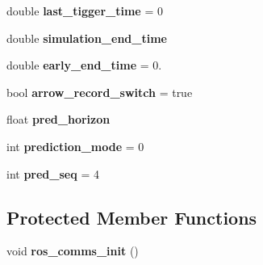 \begin{DoxyCompactItemize}
\item 
double {\bfseries last\+\_\+tigger\+\_\+time} = 0\hypertarget{class_q_node_a932e8eb11684f38ae2fb3f23639b7c70}{}\label{class_q_node_a932e8eb11684f38ae2fb3f23639b7c70}

\item 
double {\bfseries simulation\+\_\+end\+\_\+time}\hypertarget{class_q_node_a7a127726e48aa5bde733d715af7a744c}{}\label{class_q_node_a7a127726e48aa5bde733d715af7a744c}

\item 
double {\bfseries early\+\_\+end\+\_\+time} = 0.\hypertarget{class_q_node_a6e6b7e12d0d9bbc230cc9dc42a2bd087}{}\label{class_q_node_a6e6b7e12d0d9bbc230cc9dc42a2bd087}

\item 
bool {\bfseries arrow\+\_\+record\+\_\+switch} = true\hypertarget{class_q_node_ada91a6275708099206c452df47210045}{}\label{class_q_node_ada91a6275708099206c452df47210045}

\item 
float {\bfseries pred\+\_\+horizon}\hypertarget{class_q_node_a3430f5db8c773c840b76794c82a9d58f}{}\label{class_q_node_a3430f5db8c773c840b76794c82a9d58f}

\item 
int {\bfseries prediction\+\_\+mode} = 0\hypertarget{class_q_node_a5d5139bf1420415b2e0c2b0e52db957e}{}\label{class_q_node_a5d5139bf1420415b2e0c2b0e52db957e}

\item 
int {\bfseries pred\+\_\+seq} = 4\hypertarget{class_q_node_aed4571afa880dc86a88b229c6517bfa1}{}\label{class_q_node_aed4571afa880dc86a88b229c6517bfa1}

\end{DoxyCompactItemize}
\subsection*{Protected Member Functions}
\begin{DoxyCompactItemize}
\item 
void {\bfseries ros\+\_\+comms\+\_\+init} ()\hypertarget{class_q_node_a498b0376fc75702fd8b61b91ef109769}{}\label{class_q_node_a498b0376fc75702fd8b61b91ef109769}

\end{DoxyCompactItemize}
